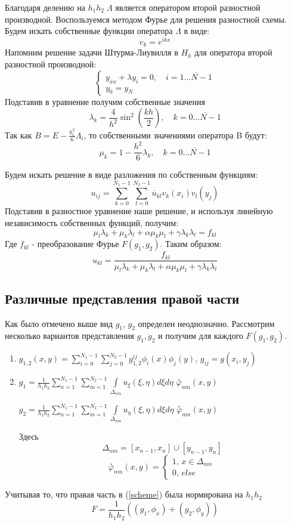 \documentclass{article}
\begin{document}
Благодаря делению на $h_1h_2\;\Lambda$ является оператором второй разностной производной.
Воспользуемся методом Фурье для решения разностной схемы. Будем искать собственные функции оператора $\Lambda$ в виде:
$$v_k = e^{ikx}$$
Напомним решение задачи Штурма-Лиувилля в $H_h$ для оператора второй разностной производной:
$$\begin{cases}
y_{\overline{x}x} + \lambda y_i = 0,\quad i = \overline{1\ldots N-1} \\
y_0 = y_N
\end{cases}$$
Подставив в уравнение получим собственные значения 
$$
\lambda_k = \frac{4}{h^2} \sin^2(\frac{kh}{2}),\quad k = \overline{0 \ldots N-1}
$$
Так как $B = E - \frac{h_i^2}{6}\Lambda_i$, то собственными значениями оператора B будут:
$$
\mu_k = 1 - \frac{h^2}{6}\lambda_k,\quad k = \overline{0 \ldots N-1}
$$

Будем искать решение в виде разложения по собственным функциям:
$$u_{ij} = \sum \limits_{k=0}^{N_1 - 1} \sum \limits_{l=0}^{N_2 - 1} \overline{u}_{kl}v_k(x_i)v_l(y_j)$$
Подставив в разностное уравнение наше решение, и используя линейную независимость собственных функций, получим:
$$\mu_l \lambda_k + \mu_k \lambda_l + \alpha \mu_k \mu_l + \gamma \lambda_k \lambda_l = f_{kl}$$
Где $f_{kl}$ - преобразование Фурье $F(g_1,g_2)$.
Таким образом:
$$u_{kl} = \frac{f_{kl}}{\mu_l \lambda_k + \mu_k \lambda_l + \alpha \mu_k \mu_l + \gamma \lambda_k \lambda_l}$$
\subsection{Различные представления правой части}
Как было отмечено выше вид $g_1,\,g_2$ определен неоднозначно. Рассмотрим несколько вариантов представления $g_1, g_2$ и получим для каждого $F(g_1,g_2)$.
\begin{enumerate}
\item$g_{1,2}(x,y) = \sum \limits_{i=0}^{N_1-1} \sum \limits_{j=0}^{N_2-1}g_{1,2}^{ij}\phi_i(x)\phi_j(y),\, g_{ij} = g(x_i,y_j)$
\item$g_1 = \frac{1}{h_1h_2} \sum \limits_{n=1}^{N_1 - 1} \sum \limits_{m=1}^{N_2 - 1} \int \limits _{\Delta_{nm}} u_\xi(\xi,\eta) d\xi d\eta$ $\overset{\circ}{\varphi}_{nm}(x,y)$

$g_2 = \frac{1}{h_1h_2} \sum \limits_{n=1}^{N_1 - 1} \sum \limits_{m=1}^{N_2 - 1} \int \limits _{\Delta_{nm}} u_\eta(\xi,\eta) d\xi d\eta$ $\overset{\circ}{\varphi}_{nm}(x,y)$ 

Здесь
$$\Delta_{nm} = [x_{n-1}, x_n] \cup [y_{n-1}, y_n] $$
$$\overset{\circ}{\varphi}_{nm}(x,y) = \begin{cases} 1, \, x \in \Delta_{nm} \\ 0, \, else\end{cases}$$ 
\end{enumerate}
Учитывая то, что правая часть в (\ref{scheme}) была нормирована на $h_1h_2$
\begin{equation}\label{F}
F = \frac{1}{h_1h_2}((g_1,\phi_x) + (g_2,\phi_y))
\end{equation} 
\end{document}
